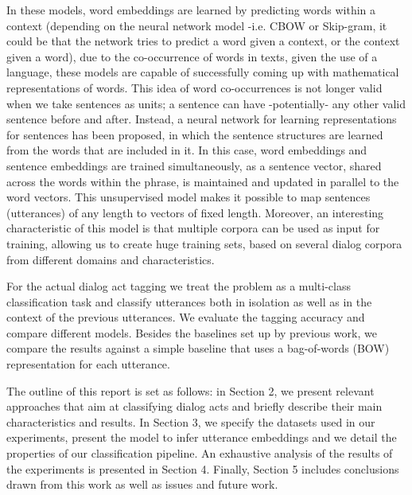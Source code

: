 In these models, word embeddings are learned by predicting words within a context (depending on the neural network model -i.e. CBOW or Skip-gram, it could be that the network tries to predict a word given a context, or the context given a word), due to the co-occurrence of words in texts, given the use of a language, these models are capable of successfully coming up with mathematical representations of words. This idea of word co-occurrences is not longer valid when we take sentences as units; a sentence can have -potentially- any other valid sentence before and after. Instead, a neural network for learning representations for sentences has been proposed, in which the sentence structures are learned from the words that are included in it.  In this case, word embeddings and sentence embeddings are trained simultaneously, as a sentence vector, shared across the words within the phrase, is maintained and updated in parallel to the word vectors.  This unsupervised model makes it possible to map sentences (utterances) of any length to vectors of fixed length. Moreover, an interesting characteristic of this model is that multiple corpora can be used as input for training, allowing us to create huge training sets, based on several dialog corpora from different domains and characteristics.

For the actual dialog act tagging we treat the problem as a multi-class classification task and classify utterances both in isolation as well as in the context of the previous utterances. We evaluate the tagging accuracy and compare different models. Besides the baselines set up by previous work, we compare the results against a simple baseline that uses a bag-of-words (BOW) representation for each utterance. 

The outline of this report is set as follows: in Section 2, we present relevant approaches that aim at classifying dialog acts and briefly describe their main characteristics and results. In Section 3, we specify the datasets used in our experiments, present the model to infer utterance embeddings and we detail the properties of our classification pipeline. An exhaustive analysis of the results of the experiments is presented in Section 4. Finally, Section 5 includes conclusions drawn from this work as well as issues and future work. 